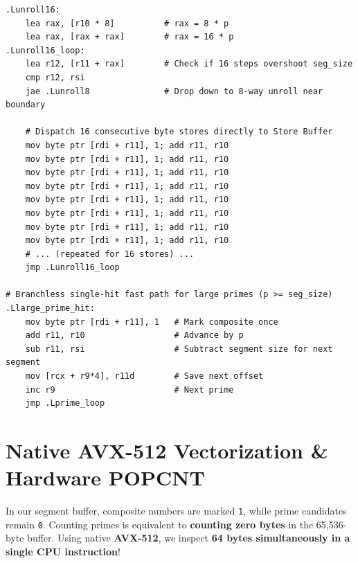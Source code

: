\documentclass[11pt,a4paper]{article}
\begin{document}
\begin{lstlisting}[language={[x86masm]Assembler}, caption={16-Way Unrolled Inner Loop and Branchless Fast Path in sieve\_kernel.s}]
.Lunroll16:
    lea rax, [r10 * 8]          # rax = 8 * p
    lea rax, [rax + rax]        # rax = 16 * p
.Lunroll16_loop:
    lea r12, [r11 + rax]        # Check if 16 steps overshoot seg_size
    cmp r12, rsi
    jae .Lunroll8               # Drop down to 8-way unroll near boundary

    # Dispatch 16 consecutive byte stores directly to Store Buffer
    mov byte ptr [rdi + r11], 1; add r11, r10
    mov byte ptr [rdi + r11], 1; add r11, r10
    mov byte ptr [rdi + r11], 1; add r11, r10
    mov byte ptr [rdi + r11], 1; add r11, r10
    mov byte ptr [rdi + r11], 1; add r11, r10
    mov byte ptr [rdi + r11], 1; add r11, r10
    mov byte ptr [rdi + r11], 1; add r11, r10
    mov byte ptr [rdi + r11], 1; add r11, r10
    # ... (repeated for 16 stores) ...
    jmp .Lunroll16_loop

# Branchless single-hit fast path for large primes (p >= seg_size)
.Llarge_prime_hit:
    mov byte ptr [rdi + r11], 1   # Mark composite once
    add r11, r10                  # Advance by p
    sub r11, rsi                  # Subtract segment size for next segment
    mov [rcx + r9*4], r11d        # Save next offset
    inc r9                        # Next prime
    jmp .Lprime_loop
\end{lstlisting}

\newpage

\section{Native AVX-512 Vectorization \& Hardware POPCNT}

In our segment buffer, composite numbers are marked \texttt{1}, while prime candidates remain \texttt{0}.
Counting primes is equivalent to \textbf{counting zero bytes} in the 65,536-byte buffer. Using native \textbf{AVX-512}, we inspect \textbf{64 bytes simultaneously in a single CPU instruction}!
\end{document}
